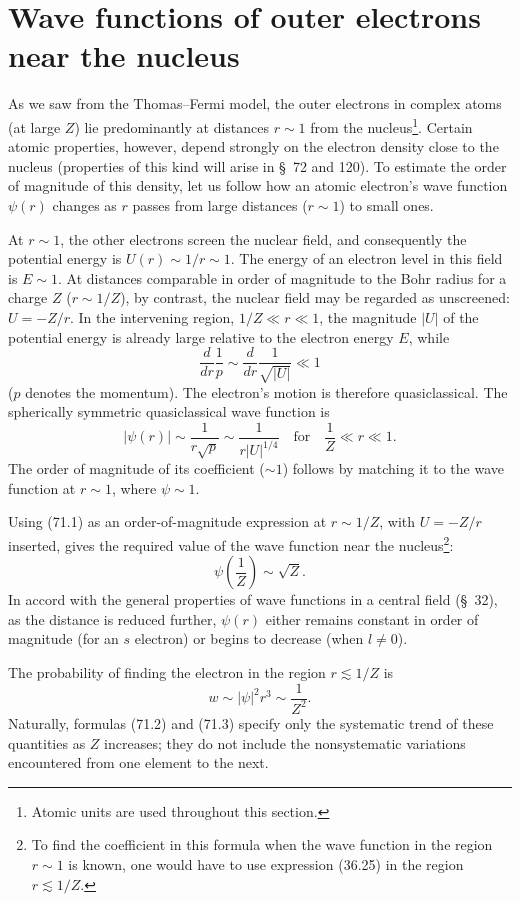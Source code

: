 \section{Wave functions of outer electrons near the nucleus}

As we saw from the Thomas--Fermi model, the outer electrons in complex atoms (at large $Z$) lie predominantly at distances $r\sim1$ from the nucleus\footnote{Atomic units are used throughout this section.}. Certain atomic properties, however, depend strongly on the electron density close to the nucleus (properties of this kind will arise in \S~72 and 120). To estimate the order of magnitude of this density, let us follow how an atomic electron's wave function $\psi(r)$ changes as $r$ passes from large distances ($r\sim1$) to small ones.

At $r\sim1$, the other electrons screen the nuclear field, and consequently the potential energy is $U(r)\sim1/r\sim1$. The energy of an electron level in this field is $E\sim1$. At distances comparable in order of magnitude to the Bohr radius for a charge $Z$ ($r\sim1/Z$), by contrast, the nuclear field may be regarded as unscreened: $U=-Z/r$. In the intervening region, $1/Z\ll r\ll1$, the magnitude $|U|$ of the potential energy is already large relative to the electron energy $E$, while
\[
 \frac{d}{dr}\frac1p\sim\frac{d}{dr}\frac1{\sqrt{|U|}}\ll1
\]
($p$ denotes the momentum). The electron's motion is therefore quasiclassical. The spherically symmetric quasiclassical wave function is
\begin{equation}
 |\psi(r)|\sim\frac1{r\sqrt p}\sim\frac1{r|U|^{1/4}}\quad\text{for}\quad \frac1Z\ll r\ll1.
 \tag{71.1}
\end{equation}
The order of magnitude of its coefficient ($\sim1$) follows by matching it to the wave function at $r\sim1$, where $\psi\sim1$.

Using (71.1) as an order-of-magnitude expression at $r\sim1/Z$, with $U=-Z/r$ inserted, gives the required value of the wave function near the nucleus\footnote{To find the coefficient in this formula when the wave function in the region $r\sim1$ is known, one would have to use expression (36.25) in the region $r\lesssim1/Z$.}:
\begin{equation}
 \psi\left(\frac1Z\right)\sim\sqrt Z.
 \tag{71.2}
\end{equation}
In accord with the general properties of wave functions in a central field (\S~32), as the distance is reduced further, $\psi(r)$ either remains constant in order of magnitude (for an $s$ electron) or begins to decrease (when $l\ne0$).

The probability of finding the electron in the region $r\lesssim1/Z$ is
\begin{equation}
 w\sim|\psi|^2r^3\sim\frac1{Z^2}.
 \tag{71.3}
\end{equation}
Naturally, formulas (71.2) and (71.3) specify only the systematic trend of these quantities as $Z$ increases; they do not include the nonsystematic variations encountered from one element to the next.
